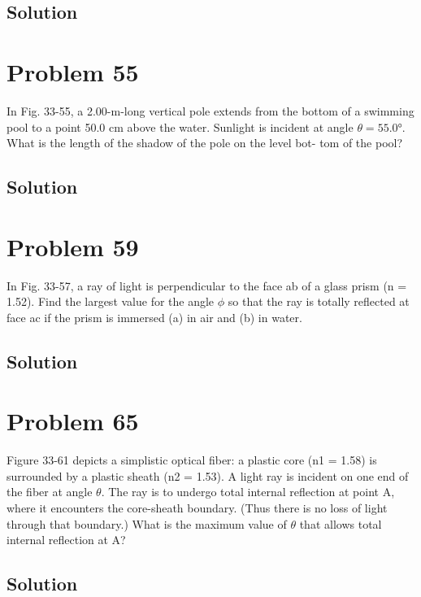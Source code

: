 \documentclass[12pt]{article}
\begin{document}
        \subsection{Solution}

    \pagebreak
    \section{Problem 55}
        In Fig. 33-55, a
2.00-m-long vertical pole extends
from the bottom of a swimming pool
to a point 50.0 cm above the water.
Sunlight is incident at angle
$\theta = 55.0\unit{\degree}$. What is the length of the
shadow of the pole on the level bot-
tom of the pool?

        \subsection{Solution}

    \pagebreak
    \section{Problem 59}
        In Fig. 33-57, a
ray of light is perpendicular to the
face ab of a glass prism (n = 1.52).
Find the largest value for the angle
$\phi$ so that the ray is totally reflected
at face ac if the prism is immersed
(a) in air and (b) in water.

        \subsection{Solution}

    \pagebreak
    \section{Problem 65}
        Figure 33-61 depicts a
simplistic optical fiber: a plastic
core (n1 = 1.58) is surrounded by a
plastic sheath (n2 = 1.53). A light ray
is incident on one end of the fiber
at angle $\theta$. The ray is to undergo
total internal reflection at point A,
where it encounters the core-sheath
boundary. (Thus there is no loss of
light through that boundary.) What is the maximum value of $\theta$ that
allows total internal reflection at A?

        \subsection{Solution}
\end{document}

